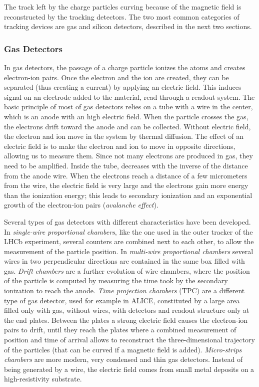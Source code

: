The track left by the charge particles curving because of the magnetic field is reconstructed by the tracking detectors. The two most common categories of tracking devices are gas and silicon detectors, described in the next two sections.

\subsubsection{Gas Detectors}

In gas detectors, the passage of a charge particle ionizes the atoms and creates electron-ion pairs. Once the electron and the ion are created, they can be separated (thus creating a current) by applying an electric field. This induces signal on an electrode added to the material, read through a readout system. The basic principle of most of gas detectors relies on a tube with a wire in the center, which is an anode with an high electric field. When the particle crosses the gas, the electrons drift toward the anode and can be collected. Without electric field, the electron and ion move in the system by thermal diffusion. The effect of an electric field is to make the electron and ion to move in opposite directions, allowing us to measure them. Since not many electrons are produced in gas, they need to be amplified. Inside the tube, decreases with the inverse of the distance from the anode wire. When the electrons reach a distance of a few micrometers from the wire, the electric field is very large and the electrons gain more energy than the ionization energy; this leads to secondary ionization and an exponential growth of the electron-ion pairs (\textit{avalanche effect}). 

Several types of gas detectors with different characteristics have been developed. In \textit{single-wire proportional chambers}, like the one used in the outer tracker of the LHCb experiment, several counters are combined next to each other, to allow the measurement of the particle position. In \textit{multi-wire proportional chambers} \cite{CHARPAK1968262} several wires in two perpendicular directions are contained in the same box filled with gas. \textit{Drift chambers} are a further evolution of wire chambers, where the position of the particle is computed by measuring the time took by the secondary ionization to reach the anode. \textit{Time projection chambers} (TPC) are a different type of gas detector, used for example in ALICE, constituted by a large area filled only with gas, without wires, with detectors and readout structure only at the end plates. Between the plates a strong electric field causes the electron-ion pairs to drift, until they reach the plates where a combined measurement of position and time of arrival allows to reconstruct the three-dimensional trajectory of the particles (that can be curved if a magnetic field is added). \textit{Micro-strips chambers} \cite{OED1988351} are more modern, very condensed and thin gas detectors. Instead of being generated by a wire, the electric field comes from small metal deposits on a high-resistivity substrate.   

